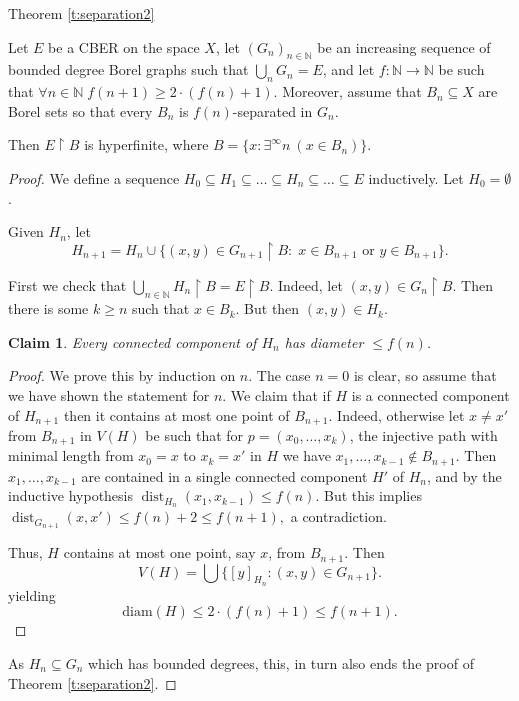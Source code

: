 \documentclass[11pt]{amsart}
\newcommand{\thistheoremname}{}
\newtheorem*{genericthm*}{\thistheoremname}
\newenvironment{namedthm*}[1]
{\renewcommand{\thistheoremname}{#1}%
	\begin{genericthm*}}
	{\end{genericthm*}}
\newcommand{\N}{\mathbb{N}}
\renewcommand{\restriction}[2]{#1 \upharpoonright #2}
\newtheorem{claim}[theorem]{Claim}
\theoremstyle{definition}
\numberwithin{equation}{section}
\DeclareMathOperator{\dist}{dist}
\newcommand{\rstr}{\restriction}
\newcommand{\sse}{\subseteq}
\begin{document}
	\begin{namedthm*}{Theorem \ref{t:separation2}}
		
		Let $E$ be a CBER on the space $X$, let $(G_n)_{n \in \N}$ be an increasing sequence of bounded degree Borel graphs such that $\bigcup_n G_n=E$, and let $f:\N\to\N$ be such that $\forall n\in\N\; f(n+1)\ge2\cdot(f(n)+1)$. Moreover, assume that $B_n \subseteq X$ are Borel sets so that every $B_n$ is $f(n)$-separated in $G_n$. 
		
		Then $\restriction{E}{B}$ is hyperfinite, where $B=\{x:\exists^\infty n \ (x \in B_n)\}$.
	\end{namedthm*}

	\begin{proof}
		
		We define a sequence $H_0 \subseteq H_1 \subseteq \dots \subseteq H_n \subseteq \dots \subseteq E$ inductively. Let $H_0=\emptyset$. 
		
		Given $H_n$, let \[H_{n+1}=H_{n} \cup \{(x,y) \in \restriction{G_{n+1}}{B}:\; x\in B_{n+1} \text{ or } y\in B_{n+1}\}.\]
		
		First we check that $\rstr{\bigcup_{n \in \N} H_n}{B}=\restriction{E}{B}$. Indeed, let $(x,y) \in \rstr{G_n}{B}$. Then there is some $k \geq n$ such that $x \in B_k$. But then $(x,y) \in H_k$. 
		
		\begin{claim}
			Every connected component of $H_n$ has diameter $\le f(n)$. 
			
		\end{claim}
		\begin{proof}
			We prove this by induction on $n$. The case $n=0$ is clear, so assume that we have shown the statement for $n$. We claim that if $H$ is a connected component of $H_{n+1}$ then it contains at most one point of $B_{n+1}$. Indeed, otherwise let $x \neq x' $ from $B_{n+1}$ in $V(H)$ be such that for $p=(x_0,\dots,x_k)$, the injective path with minimal length from $x_0=x$ to $x_k=x'$ in $H$ we have $x_1,\ldots,x_{k-1}\notin B_{n+1}$. Then $x_1,\ldots,x_{k-1}$ are contained in a single connected component $H'$ of $H_n$, and by the inductive hypothesis $\dist_{H_n}(x_1,x_{k-1})\le f(n).$ But this implies $\dist_{G_{n+1}}(x,x')\le f(n)+2\le f(n+1),$ a contradiction.
			
			Thus, $H$ contains at most one point, say $x$, from $B_{n+1}$. Then \[V(H)=\bigcup \{[y]_{H_{n}}:(x,y) \in G_{n+1}\}.\]
			yielding \[\text{diam}(H) \le 2\cdot (f(n)+1) \le f(n+1).\]
		\end{proof}
		
		As $H_n\sse G_n$ which has bounded degrees, this, in turn also ends the proof of Theorem \ref{t:separation2}.
	\end{proof}
\end{document}
